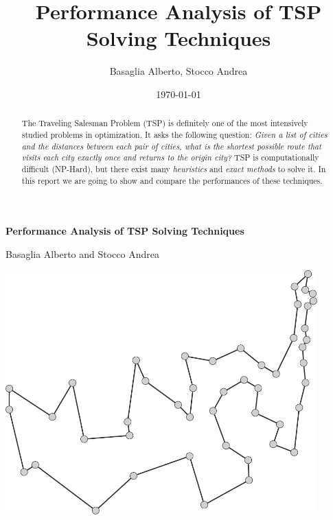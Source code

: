 \documentclass{article}
\title{Performance Analysis of TSP Solving Techniques}
\author{Basaglia Alberto, Stocco Andrea}
\date{\today}
\begin{document}
\begin{titlepage}
    \centering
    \vspace*{\fill}

    \vspace*{0.5cm}

    \huge\bfseries
        Performance Analysis of TSP Solving Techniques

    \vspace*{0.5cm}

    \large Basaglia Alberto and Stocco Andrea

    \vspace*{2cm}

    \includegraphics[width=12cm]{assets/cover.pdf} %


    \vspace*{\fill}
\end{titlepage}

\newpage

\begin{abstract}
The Traveling Salesman Problem (TSP) is definitely one of the most intensively studied problems in optimization.
It asks the following question:
\textit{Given a list of cities and the distances between each pair of cities, what is the shortest possible route
that visits each city exactly once and returns to the origin city?}
TSP is computationally difficult (NP-Hard), but there exist many \textit{heuristics} and \textit{exact methods} to solve it.
In this report we are going to show and compare the performances of these
techniques.
\end{abstract}

\newpage
\tableofcontents
\newpage
\end{document}
